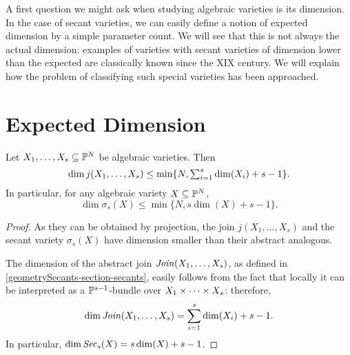 
A first question we might ask when studying algebraic varieties is its dimension. In the case of secant varieties, we can easily define a notion of expected dimension by a simple parameter count. We will see that this is not always the actual dimension: examples of varieties with secant varieties of dimension lower than the expected are classically known since the XIX century. We will explain how the problem of classifying such special varieties has been approached. 

\section{Expected Dimension}
\label{geometrySecants-section-expectedDimension}

\begin{lemma}
\label{geometrySecants-lemma-expecteddimension}
Let $X_1, \ldots , X_s \subseteq \mathbb{P}^N$ be algebraic varieties. Then 
\[
    \dim j(X_1, \ldots , X_s) \leq \min\{ N, \textstyle\sum_{i=1}^s \dim(X_i) + s-1\}.
\]
In particular, for any algebraic variety $X \subseteq \mathbb{P}^N$,  
\[
    \dim \sigma_s(X) \leq \min\{ N , s\dim(X) + s - 1\}.
\]
\end{lemma}
\begin{proof}
As they can be obtained by projection, the join $j(X_1,\ldots,X_s)$ and the secant variety $\sigma_s(X)$ have dimension smaller than their abstract analogous.

The dimension of the abstract join $\mathit{Join}(X_1,\ldots,X_s)$, as defined in \ref{geometrySecants-section-secants}, easily follows from the fact that locally it can be interpreted as a $\mathbb{P}^{s-1}$-bundle over $X_1 \times \cdots \times X_s$: therefore, 
    \[
        \dim \mathit{Join}(X_1,\ldots,X_s) = \sum_{i=1}^s \dim(X_i) + s-1.
    \]
    In particular, $\dim \mathit{Sec}_s(X) = s\dim(X) + s-1$.
\end{proof}

